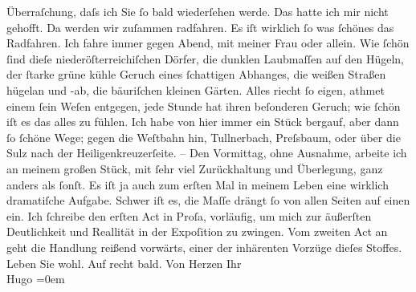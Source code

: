 \begin{ledgroupsized}[t]{13cm}
               Überraſchung, daſs ich Sie ſo bald wiederſehen werde. Das hatte ich mir nicht
               gehofft.\pend
           \pstart
           Da werden wir zuſammen radfahren. Es iſt wirklich ſo was ſchönes das Radfahren. Ich
               fahre immer gegen Abend, mit meiner Frau oder allein. Wie ſchön ſind dieſe niederöſterreichiſchen Dörfer, die dunklen Laubmaſſen auf den
               Hügeln, der ſtarke grüne kühle Geruch eines ſchattigen Abhanges, die weißen Straßen
               hügelan und -ab, die bäuriſchen kleinen Gärten. Alles riecht ſo eigen, athmet einem
               ſein {\pb}Weſen entgegen, jede Stunde
               hat ihren beſonderen Geruch; wie ſchön iſt es das alles zu fühlen.\pend
           \pstart
           Ich habe von hier immer ein Stück bergauf, aber dann ſo ſchöne Wege; gegen die Weſtbahn hin, Tullnerbach, Preſsbaum, oder über die
                  Sulz nach der Heiligenkreuzerſeite.\pend
           \pstart
           \numberlinefalse{}–\numberlinetrue{}\pend
           \pstart
           Den Vormittag, ohne Ausnahme, arbeite ich an meinem großen Stück, mit ſehr viel Zurückhaltung und
               Überlegung, ganz anders als ſonſt. Es iſt {\pb}ja auch zum erſten Mal in meinem
               Leben eine wirklich dramatiſche Aufgabe. Schwer iſt es, die Maſſe drängt ſo von allen
               Seiten auf einen ein. Ich ſchreibe den erſten Act in Proſa, vorläufig, um mich zur
               äußerſten Deutlichkeit und Reallität in der Expoſition zu zwingen.\pend
           \pstart
           Vom zweiten Act an geht die Handlung reißend vorwärts, einer der inhärenten Vorzüge
               dieſes Stoffes.\pend
           \pstart
           Leben Sie wohl. Auf recht bald.\pend
           \pstart
           Von Herzen Ihr{\\[\baselineskip]}\spacefill\mbox{Hugo}\pend
           \leftskip=0em{}
         
         \endnumbering{}\end{ledgroupsized}  \newcommand{\dateiname}{L01161}\newcommand{\titel}{Hugo von Hofmannsthal an Arthur Schnitzler, 12. 8. [1901]}\newcommand{\editorInnen}{Martin Anton Müller und Gerd-Hermann Susen}
      